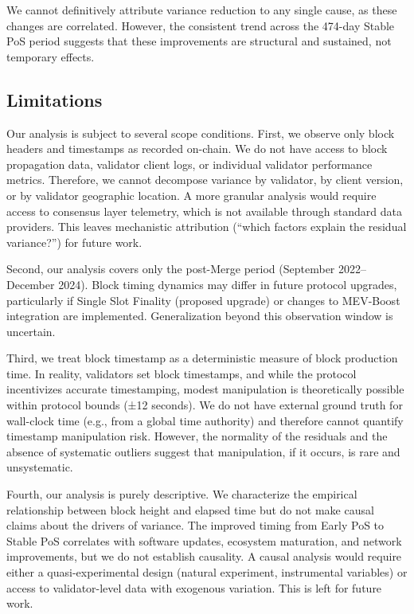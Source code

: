 \documentclass[12pt]{article}
\begin{document}
We cannot definitively attribute variance reduction to any single cause, as these changes are correlated. However, the consistent trend across the 474-day Stable PoS period suggests that these improvements are structural and sustained, not temporary effects.

\subsection{Limitations}

Our analysis is subject to several scope conditions. First, we observe only block headers and timestamps as recorded on-chain. We do not have access to block propagation data, validator client logs, or individual validator performance metrics. Therefore, we cannot decompose variance by validator, by client version, or by validator geographic location. A more granular analysis would require access to consensus layer telemetry, which is not available through standard data providers. This leaves mechanistic attribution (``which factors explain the residual variance?'') for future work.

Second, our analysis covers only the post-Merge period (September 2022–December 2024). Block timing dynamics may differ in future protocol upgrades, particularly if Single Slot Finality (proposed upgrade) or changes to MEV-Boost integration are implemented. Generalization beyond this observation window is uncertain.

Third, we treat block timestamp as a deterministic measure of block production time. In reality, validators set block timestamps, and while the protocol incentivizes accurate timestamping, modest manipulation is theoretically possible within protocol bounds (±12 seconds). We do not have external ground truth for wall-clock time (e.g., from a global time authority) and therefore cannot quantify timestamp manipulation risk. However, the normality of the residuals and the absence of systematic outliers suggest that manipulation, if it occurs, is rare and unsystematic.

Fourth, our analysis is purely descriptive. We characterize the empirical relationship between block height and elapsed time but do not make causal claims about the drivers of variance. The improved timing from Early PoS to Stable PoS correlates with software updates, ecosystem maturation, and network improvements, but we do not establish causality. A causal analysis would require either a quasi-experimental design (natural experiment, instrumental variables) or access to validator-level data with exogenous variation. This is left for future work.
\end{document}

